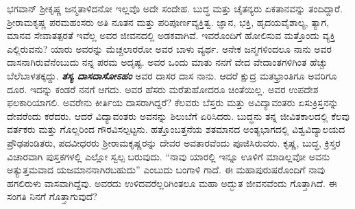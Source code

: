 ಭಗವಾನ್ ಶ‍್ರೀಕೃಷ್ಣ ಜನ್ಮತಾಳಿದನೋ ಇಲ್ಲವೊ ಅದೇ ಸಂದೇಹ. ಬುದ್ಧ ಮತ್ತು ಚೈತನ್ಯರು ಏಕತಾನವನ್ನು ತಂದಿದ್ದಾರೆ. ಶ‍್ರೀರಾಮಕೃಷ್ಣ ಪರಮಹಂಸರು ಅತಿ ನೂತನ ಮತ್ತು ಪರಿಪೂರ್ಣವ್ಯಕ್ತಿತ್ವ. ಜ್ಞಾನ, ಭಕ್ತಿ, ಹೃದಯವೈಶಾಲ್ಯ, ತ್ಯಾಗ, ಮಾನವ ಸೇವಾತತ್ಪರತೆ ಇವೆಲ್ಲ ಅವರ ಜೀವನದಲ್ಲಿ ಅಡಕವಾಗಿವೆ. ಇವರೊಂದಿಗೆ ಹೋಲಿಸುವ ಮತ್ತೊಂದು ವ್ಯಕ್ತಿ ಎಲ್ಲಿರುವನು? ಯಾರು ಅವರನ್ನು ಮೆಚ್ಚಲಾರರೋ ಅವರ ಬಾಳು ವ್ಯರ್ಥ. ಅನೇಕ ಜನ್ಮಗಳಿಂದಲೂ ನಾನು ಅವರ ದಾಸನಾಗಿರುವೆನೆಂಬುದು ನನ್ನ ಪರಮ ಅದೃಷ್ಟ. ಅವರ ಒಂದು ಮಾತು ನನಗೆ ವೇದ ವೇದಾಂತಗಳಿಗಿಂತ ಹೆಚ್ಚು ಬೆಲೆಬಾಳತಕ್ಕದ್ದು. \textbf{\textit{ತಸ್ಯ ದಾಸದಾಸೋಽಹಂ}}\enginline{-} ಅವರ ದಾಸರ ದಾಸ ನಾನು. ಆದರೆ ಕ್ಷುದ್ರ ಮತಭ್ರಾಂತಿಗೂ ಅವರಿಗೂ ದೂರ. ಇದನ್ನು ಕಂಡರೆ ನನಗೆ ಆಗದು. ಅವರ ಹೆಸರು ಮರೆತುಹೋದರೂ ಚಿಂತೆಯಿಲ್ಲ. ಅವರ ಉಪದೇಶ ಫಲಕಾರಿಯಾಗಲಿ. ಅವರೇನು ಕೀರ್ತಿಯ ದಾಸರಾಗಿದ್ದರೆ? ಕೆಲವರು ಬೆಸ್ತರು ಮತ್ತು ಅವಿದ್ಯಾವಂತರು ಏಸುಕ್ರಿಸ್ತನನ್ನು ದೇವರೆಂದು ಕರೆದರು. ಆದರೆ ವಿದ್ಯಾವಂತರು ಅವನನ್ನು ಶಿಲುಬೆಗೆ ಏರಿಸಿದರು. ಬುದ್ಧನು ತನ್ನ ಜೀವಿತಕಾಲದಲ್ಲಿ ಕೆಲವು ವರ್ತಕರು ಮತ್ತು ಗೊಲ್ಲರಿಂದ ಗೌರವಿಸಲ್ಪಟ್ಟನು. ಹತ್ತೊಂಬತ್ತನೆಯ ಶತಮಾನದ ಅಂತ್ಯಭಾಗದಲ್ಲಿ ವಿಶ್ವವಿದ್ಯಾಲಯದ ಪ್ರೌಢಪಂಡಿತರು, ಪದವೀಧರರು ಶ‍್ರೀರಾಮಕೃಷ್ಣರನ್ನು ದೇವರ ಅವತಾರವೆಂದು ಪೂಜಿಸಿರುವರು. ಕೃಷ್ಣ, ಬುದ್ಧ, ಕ್ರಿಸ್ತರ ವಿಚಾರವಾಗಿ ಪುಸ್ತಕಗಳಲ್ಲಿ ಎಲ್ಲೋ ಸ್ವಲ್ಪ ಬರುವುದು. ``ನಾವು ಯಾರಲ್ಲಿ ಇನ್ನೂ ಊಳಿಗೆ ಮಾಡಿಲ್ಲವೋ ಅವನು ಅತ್ಯುತ್ತಮವಾದ ಯಜಮಾನನಾಗಿರಬಹುದು'' ಎಂಬುದು ಬಂಗಾಳಿ ಗಾದೆ. ಈ ಮಹಾಪುರುಷರೊಂದಿಗೆ ನಾವು ಹಗಲಿರುಳು ವಾಸವಾಗಿದ್ದೆವು. ಅವರದು ಉಳಿದವರೆಲ್ಲರಿಗಿಂತಲೂ ಮಹಾ ಅದ್ಭುತ ಜೀವನವೆಂದು ಗೊತ್ತಾಗಿದೆ. ಈ ಸಂಗತಿ ನಿನಗೆ ಗೊತ್ತಾಗುವುದೆ?

